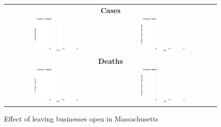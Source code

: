 \documentclass[11pt,reqno,letter]{amsart}
\theoremstyle{definition}
\begin{document}
\begin{figure}[h]
  \caption{Effect of leaving businesses open in Massachusetts \label{fig:MA-nb}}
  \begin{minipage}{\linewidth}
    \centering
    \begin{tabular}{cc}
      \multicolumn{2}{c}{\textbf{Cases}} \\
      \includegraphics[width=0.45\textwidth]{tables_and_figures/Massachusetts-nb-dgrowth_v1}
       &
         \includegraphics[width=0.45\textwidth]{tables_and_figures/Massachusetts-nb-dcases_v1}
      \\
      \multicolumn{2}{c}{\textbf{Deaths}} \\
        \includegraphics[width=0.45\textwidth]{tables_and_figures/Massachusetts-nb-dgrowth_deaths_v1}
       &      \includegraphics[width=0.45\textwidth]{tables_and_figures/Massachusetts-nb-dcases_deaths_v1}
    \end{tabular}
  \end{minipage}
\end{figure}
\end{document}
